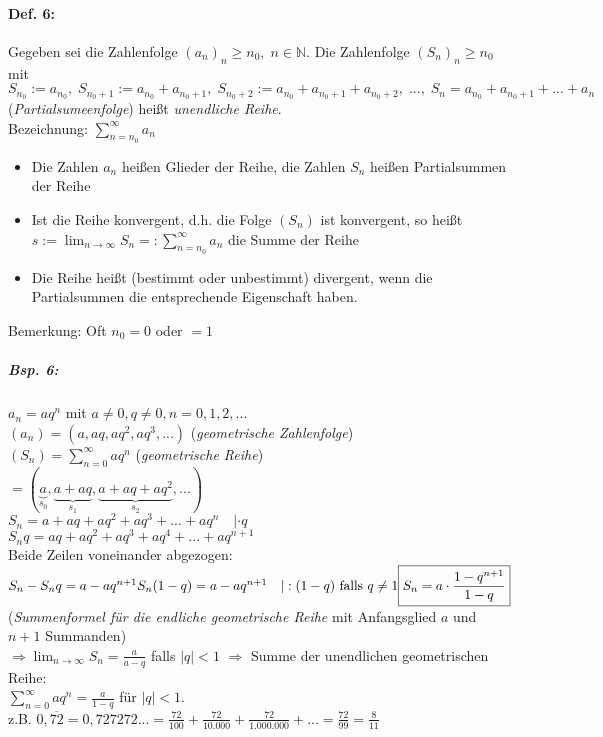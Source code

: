 \paragraph{Def. 6:} 
Gegeben sei die Zahlenfolge $(a_n)_n \geq n_0, \; n\in \mathbb{N}$. Die Zahlenfolge $(S_n)_n \geq n_0$ mit $S_{n_0}:=a_{n_0}, \; S_{n_0 + 1} := a_{n_0}+a_{n_0 +1}, \; S_{n_0 +2} := a_{n_0} + a_{n_0 +1} + a_{n_0 +2}, \; ..., \; S_n=a_{n_0}+a_{n_0 +1} +...+a_n$ (\emph{Partialsumeenfolge}) heißt \emph{unendliche Reihe}.\\
Bezeichnung: $\boxed{\sum_{n=n_0}^{\infty} a_n}$
\begin{itemize}
\item Die Zahlen $a_n$ heißen Glieder der Reihe, die Zahlen $S_n$ heißen Partialsummen der Reihe
\item Ist die Reihe konvergent, d.h. die Folge $(S_n)$ ist konvergent, so heißt $s:=\lim_{n\to \infty}S_n=: \sum_{n=n_0}^{\infty} a_n$ die Summe der Reihe
\item Die Reihe heißt (bestimmt oder unbestimmt) divergent, wenn die Partialsummen die entsprechende Eigenschaft haben.
\end{itemize}
Bemerkung: Oft $n_0=0$ oder $=1$
\subparagraph{Bsp. 6:} $a_n=a q^n$ mit $a\not = 0, q \not = 0, n=0,1,2,...$\\
$(a_n)=(a, aq, aq^2, aq^3,...)$ (\emph{geometrische Zahlenfolge})\\
$(S_n)=\sum_{n=0}^\infty aq^n$ (\emph{geometrische Reihe})\\
$= (\underbrace{a}_{s_0}, \underbrace{a+aq}_{s_1}, \underbrace{a+ aq+ aq^2}_{s_2}, ...)$\\
$S_n=a + aq + aq^2 + aq^3+...+aq^n \quad | \cdot q$\\
$S_nq=aq+aq^2+aq^3+aq^4+...+aq^{n+1}$\\
Beide Zeilen voneinander abgezogen:\\
$S_n-S_nq = a - aq^{n+1}\\
S_n(1-q) = a - aq^{n+1} \quad | : (1-q) \text{ falls }q\not = 1\\
\boxed{S_n = a\cdot \frac{1-q^{n+1}}{1-q}}$ (\emph{Summenformel für die endliche geometrische Reihe} mit Anfangsglied $a$ und $n+1$ Summanden)\\
$\Rightarrow \lim_{n\to \infty}S_n=\frac{a}{a-q}$ falls $|q|<1$
$\Rightarrow$ Summe der unendlichen geometrischen Reihe:\\
$\boxed{\sum_{n=0}^\infty a q^n=\frac{a}{1-q}}$ für $|q|<1$.\\
z.B. $0,\overline{72}=0,727272...=\frac{72}{100}+\frac{72}{10.000}+\frac{72}{1.000.000}+...=\frac{72}{99}=\frac{8}{11}$

